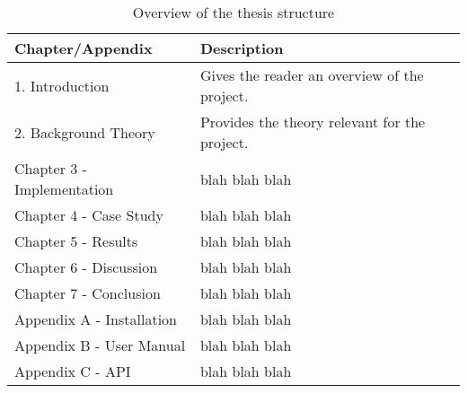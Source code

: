 \begin{table}[!h]
\begin{center}
\begin{tabular}{ | l | l |}
\hline
\textbf{Chapter/Appendix} & \textbf{Description} \\ \hline
1. Introduction & Gives the reader an overview of the project. \\ \hline
2. Background Theory & Provides the theory relevant for the project. \\ \hline
Chapter 3 - Implementation & blah blah blah \\ \hline
Chapter 4 - Case Study & blah blah blah \\ \hline
Chapter 5 - Results & blah blah blah \\ \hline
Chapter 6 - Discussion & blah blah blah \\ \hline
Chapter 7 - Conclusion & blah blah blah \\ \hline
Appendix A - Installation & blah blah blah \\ \hline
Appendix B - User Manual & blah blah blah \\ \hline
Appendix C - API & blah blah blah \\ \hline
\end{tabular}
\end{center}
\caption{Overview of the thesis structure}
\label{Tab1}
\end{table}

\cleardoublepage
